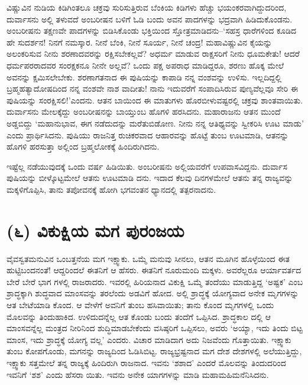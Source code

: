 ವಿಷ್ಣುವಿನ ನುಡಿಯ ಕಿಡಿಗಿಂತಲೂ ಚಕ್ರವು ಸುರಿಸುತ್ತಿರುವ ಬೆಂಕಿಯ ಕಿಡಿಗಳು ಹೆಚ್ಚು ಭಯಂಕರವಾಗಿದ್ದುದರಿಂದ, ದುರ್ವಾಸನು ಅಲ್ಲಿ ತಳುವದೆ ಅಂಬರೀಷನ ಬಳಿಗೆ ಓಡಿ ಬಂದು ಅವನ ಪಾದಗಳನ್ನು ಭದ್ರವಾಗಿ ಹಿಡಿದುಕೊಂಡನು. ಅಂಬರೀಷನು ತಕ್ಷಣವೇ ಪಾದಗಳನ್ನು ಬಿಡಿಸಿಕೊಂಡು ಭಕ್ತಿಯಿಂದ ಸ್ತೋತ್ರಮಾಡಿದನು–‘ಸಹಸ್ರ ಧಾರೆಗಳಿಂದ ಕೂಡಿದ ಹೇ ಸುದರ್ಶನ! ನಿನಗೆ ನಮಸ್ಕಾರ. ನೀನೆ ಬೆಂಕಿ, ನೀನೆ ಸೂರ್ಯ, ನೀನೆ ಚಂದ್ರ! ಮಹಾವಿಷ್ಣುವಿನ ಕೈಯನ್ನು ಅಲಂಕರಿಸುವ ನೀನು ಶರಣಾದವರನ್ನು ರಕ್ಷಿಸಬೇಕಲ್ಲವೆ? ಅಧರ್ಮ ಮಾಡುವ ರಾಕ್ಷಸರಿಗೆ ನೀನು ಧೂಮಕೇತು! ಆದರೆ ಧರ್ಮಪರರಾದವರ ಸಂರಕ್ಷಕನೂ ನೀನೇ ಅಲ್ಲವೆ? ಒಂದು ಪಕ್ಷ ಅಪರಾಧ ಮಾಡಿದ್ದರೂ, ಶರಣು ಹೊಕ್ಕ ಮೇಲೆ ಅವನನ್ನು ಕ್ಷಮಿಸಲೇಬೇಕು. ಶರಣಾಗತನಾದ ಈ ಪುಷಿಯನ್ನು ಕಾಪಾಡಿ ನನ್ನ ವಂಶವನ್ನು ಉಳಿಸು. ಇಲ್ಲದಿದ್ದಲ್ಲಿ ಬ್ರಹ್ಮಹತ್ಯಾದೋಷದಿಂದ ನನ್ನ ವಂಶವೇ ನಾಶ ವಾದೀತು! ನಾನು ಇದುವರೆಗೆ ಸಂಪಾದಿಸಿರುವ ಪುಣ್ಯವೆಲ್ಲವೂ ಸೇರಿ ಈ ಪುಷಿಯನ್ನು ಸಂರಕ್ಷಿಸಲಿ!’ಎಂದನು. ಆತನ ಬಾಯಿಂದ ಈ ಮಾತುಗಳು ಹೊರಬೀಳುವಷ್ಟರಲ್ಲಿ ಚಕ್ರವು ಶಾಂತವಾಯಿತು. ದುರ್ವಾಸನು ಮೇಲಕ್ಕೆದ್ದು ಅಂಬರೀಷನನ್ನು ಬಾಯ್ತುಂಬ ಹೊಗಳಿ ಹರಸಿದನು. ಮಹಾರಾಜನು ಆತನ ಮುಂದೆ ಅಡ್ಡಬಿದ್ದು ‘ಮಹಾನುಭಾವ, ಈಗ ನಡೆದುದನ್ನು ಮರೆತುಬಿಡೋಣ. ನೀನು ನನ್ನ ಆತಿಥ್ಯವನ್ನು ಸ್ವೀಕರಿಸಿ ಊಟ ಮಾಡು’ ಎಂದು ಪ್ರಾರ್ಥಿಸಿದನು. ಪುಷಿಯು ರಾಜನಿತ್ತ ರುಚಿಕರವಾದ ಆಹಾರವನ್ನು ಹೊಟ್ಟೆ ತುಂಬ ಊಟಮಾಡಿ, ಆತನನ್ನು ಹೊಗಳಿ ಹರಸುತ್ತಾ ಅಲ್ಲಿಂದ ಬ್ರಹ್ಮಲೋಕಕ್ಕೆ ಹಿಂದಿರುಗಿದನು.

ಇಷ್ಟೆಲ್ಲ ನಡೆಯುವುದಕ್ಕೆ ಒಂದು ವರ್ಷ ಹಿಡಿಯಿತು. ಅಂಬರೀಷನು ಅಲ್ಲಿಯವರೆಗೆ ಉಪವಾಸವಿದ್ದನು. ದುರ್ವಾಸ ಪುಷಿಯನ್ನು ಬೀಳ್ಕೊಟ್ಟಮೇಲೆ ಆತನು ಊಟಮಾಡಿ ದನು. ಇದಾದ ಕೆಲವು ದಿನಗಳಮೇಲೆ ಆತನು ತನ್ನ ರಾಜ್ಯವನ್ನು ಮಕ್ಕಳಿಗೊಪ್ಪಿಸಿ, ತಾನು ತಪೋವನಕ್ಕೆ ಹೋಗಿ ಭಗವಂತನ ಧ್ಯಾನದಲ್ಲಿ ತತ್ಪರನಾದನು.


\section{(೬) ವಿಕುಕ್ಷಿಯ ಮಗ ಪುರಂಜಯ}

ವೈವಸ್ವತಮನುವಿನ ಒಂಬತ್ತನೆಯ ಮಗ ಇಕ್ಷ್ವಾಕು. ಒಮ್ಮೆ ಮನುವು ಸೀನಲು, ಆತನ ಮೂಗಿನ ಹೊಳ್ಳೆಯಿಂದ ಈತ ಹುಟ್ಟಿಬಂದನಂತೆ! ಆದ್ದರಿಂದಲೆ ಈತನಿಗೆ ಆ ಹೆಸರು. ಈತನಿಗೆ ನೂರುಮಂದಿ ಮಕ್ಕಳು. ಅವರೆಲ್ಲರೂ ಆರ್ಯಾವರ್ತದ ಬೇರೆ ಬೇರೆ ಭಾಗ ಗಳಲ್ಲಿ ರಾಜರಾದರು. ಇವರಲ್ಲಿ ಹಿರಿಯನಾದ ವಿಕುಕ್ಷಿ ಒಮ್ಮೆ ತಂದೆಯು ಮಾಡುತ್ತಿದ್ದ ‘ಅಷ್ಟಕ’ ಎಂಬ ಶ್ರಾದ್ಧಕ್ಕಾಗಿ ಶುದ್ಧವಾದ ಮಾಂಸವನ್ನು ತರಲೆಂದು ಅಡವಿಗೆ ಹೋದ. ಅಲ್ಲಿ ಶ್ರಾದ್ಧಕ್ಕೆ ಯೋಗ್ಯವಾದ ಅನೇಕ ಮೃಗಗಳನ್ನು ಆತ ಬೇಟೆಯಾಡಿ ಕೊಂದ. ಆ ವೇಳೆಗೆ ಅವನಿಗೆ ತುಂಬ ಹಸಿವಾಯಿತು; ತಾನು ಕೊಂದ ಮೃಗಗಳಲ್ಲಿ ಒಂದು ಮೊಲವನ್ನು ತಿಂದುಹಾಕಿದ. ಉಳಿದುದನ್ನೆಲ್ಲ ಆತ ಕೊಂಡು ಬಂದು ತಂದೆಗೆ ಒಪ್ಪಿಸಿದ. ಶ್ರಾದ್ಧಕಾಲ ದಲ್ಲಿ ಆ ಮಾಂಸವನ್ನೆಲ್ಲ ಮಂತ್ರದ ನೀರಿನಿಂದ ಶುದ್ಧಿಮಾಡಬೇಕೆಂದು ವಸಿಷ್ಠರಿಗೆ ಒಪ್ಪಿಸಲು, ಅವರು ‘ಅಯ್ಯಾ, ಇದು ತಿಂದು ಬಿಟ್ಟ ಮಾಂಸ, ಇದು ಶ್ರಾದ್ಧಕ್ಕೆ ಯೋಗ್ಯ ವಲ್ಲ’ ಎಂದರು. ವಿಚಾರ ಮಾಡಿದಾಗ ಅದು ನಿಜವೆಂದು ಗೊತ್ತಾಯಿತು. ಇಕ್ಷ್ವಾಕು ತುಂಬ ಕೋಪಗೊಂಡು, ಮಗನನ್ನು ರಾಜ್ಯದಿಂದ ಓಡಿಸಿಬಿಟ್ಟ. ರಾಜ್ಯಭ್ರಷ್ಟನಾದ ಮಗ ದೇಶ ದೇಶಗಳಲ್ಲಿ ಅಲೆಯುತ್ತಿದ್ದು, ಇಕ್ಷ್ವಾಕು ಸತ್ತಮೇಲೆ ತನ್ನ ರಾಜ್ಯಕ್ಕೆ ಹಿಂದಿರುಗಿ ರಾಜನಾದ. ಇವನು ‘ಶಶಾದ’ ಎಂದರೆ ಮೊಲವನ್ನು ತಿಂದುದರಿಂದ ಇವನಿಗೆ ‘ಶಶ’ ಎಂದು ಹೆಸರಾ ಯಿತು. ಇವನು ಅನೇಕ ಯಾಗಗಳನ್ನು ಮಾಡಿ ಮಹಾಮಹಿಮನೆನಿಸಿದನು.


